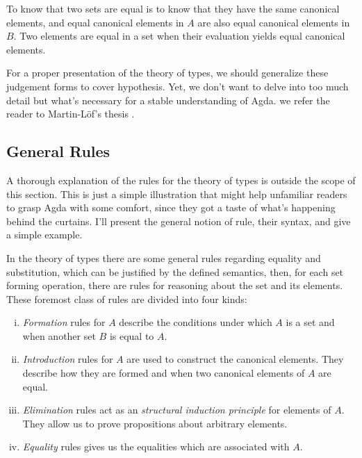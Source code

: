 To know that two sets are equal is to know that they have the same canonical elements, and
equal canonical elements in $A$ are also equal canonical elements in $B$. Two elements are
equal in a set when their evaluation yields equal canonical elements.

For a proper presentation of the theory of types, we should generalize these judgement forms
to cover hypothesis. Yet, we don't want to delve into too much detail but what's necessary for 
a stable understanding of Agda. we refer the reader to Martin-L\"{o}f's thesis \cite{lof84,lof85}.

\subsection{General Rules}

A thorough explanation of the rules for the theory of types is outside the scope of this section. 
This is just a simple illustration that might help unfamiliar readers to grasp Agda with
some comfort, since they got a taste of what's happening behind the curtains. I'll present the
general notion of rule, their syntax, and give a simple example.

In the theory of types there are some general rules regarding equality and substitution, 
which can be justified by the defined semantics, then, for each set forming operation, there
are rules for reasoning about the set and its elements. These foremost class of rules
are divided into four kinds:

\begin{enumerate}[i)]
  \item \emph{Formation} rules for $A$ describe the conditions under which $A$ is a set and
        when another set $B$ is equal to $A$.
        
  \item \emph{Introduction} rules for $A$ are used to construct the canonical elements. They
        describe how they are formed and when two canonical elements of $A$ are equal.
        
  \item \emph{Elimination} rules act as an \emph{structural induction principle} for elements of $A$.
        They allow us to prove propositions about arbitrary elements.
        
  \item \emph{Equality} rules gives us the equalities which are associated with $A$.
\end{enumerate}

